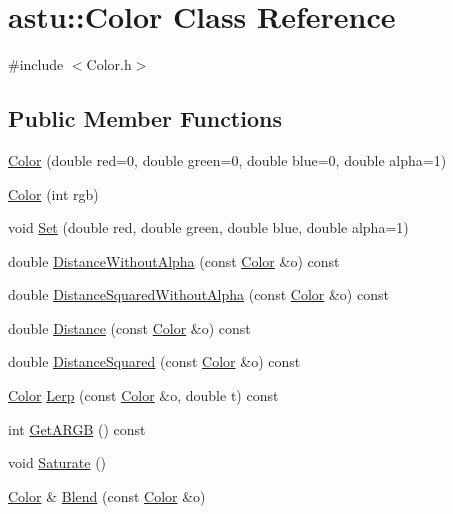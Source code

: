\hypertarget{classastu_1_1Color}{}\section{astu\+:\+:Color Class Reference}
\label{classastu_1_1Color}


{\ttfamily \#include $<$Color.\+h$>$}

\subsection*{Public Member Functions}
\begin{DoxyCompactItemize}
\item 
\hyperlink{classastu_1_1Color_a3b4505ef24790685a5e22bde22ff5b05}{Color} (double red=0, double green=0, double blue=0, double alpha=1)
\item 
\hyperlink{classastu_1_1Color_a5056ade3f6bf10a72056ffcb3d2e1f42}{Color} (int rgb)
\item 
void \hyperlink{classastu_1_1Color_a709d6f647c38187f1d4028810dfa363e}{Set} (double red, double green, double blue, double alpha=1)
\item 
double \hyperlink{classastu_1_1Color_a2a897cfc4a5706a7c3ab8562adb217d8}{Distance\+Without\+Alpha} (const \hyperlink{classastu_1_1Color}{Color} \&o) const
\item 
double \hyperlink{classastu_1_1Color_a04fc869504fd1f14d4c27d257ac0a121}{Distance\+Squared\+Without\+Alpha} (const \hyperlink{classastu_1_1Color}{Color} \&o) const
\item 
double \hyperlink{classastu_1_1Color_a53b134d44a2fba57ed560f00ce55a471}{Distance} (const \hyperlink{classastu_1_1Color}{Color} \&o) const
\item 
double \hyperlink{classastu_1_1Color_af57011227eea623101859b95127e364c}{Distance\+Squared} (const \hyperlink{classastu_1_1Color}{Color} \&o) const
\item 
\hyperlink{classastu_1_1Color}{Color} \hyperlink{classastu_1_1Color_a0dc0303a14adf0712e12e756bde1b365}{Lerp} (const \hyperlink{classastu_1_1Color}{Color} \&o, double t) const
\item 
int \hyperlink{classastu_1_1Color_a6e8ee28f89245f4e8d96c8c62144854f}{Get\+A\+R\+GB} () const
\item 
void \hyperlink{classastu_1_1Color_a612db0af9e13a8c64f1c215964d4d88f}{Saturate} ()
\item 
\hyperlink{classastu_1_1Color}{Color} \& \hyperlink{classastu_1_1Color_a3e246cf7b52ffda0f76a4fa0e7810763}{Blend} (const \hyperlink{classastu_1_1Color}{Color} \&o)

\end{DoxyCompactItemize}
